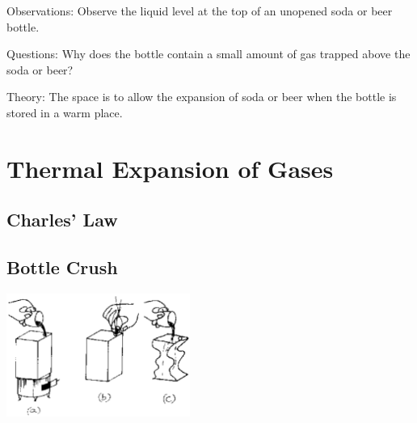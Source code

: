 \begin{multicols}{2}
\begin{description*}
\item[Observations:]{Observe the liquid level at the top of an unopened soda or beer bottle.}
\item[Questions:]{Why does the bottle contain a small amount of gas trapped above the soda or beer?}
\item[Theory:]{The space is to allow the expansion of soda or beer when the bottle is stored in a warm place.}
\end{description*}


\section*{Thermal Expansion of Gases}

\subsection*{Charles' Law}

\subsection{Bottle Crush}

\begin{center}
\includegraphics[width=0.45\textwidth]{./img/source/bottle-crush.png}
\end{center}


\end{multicols}
